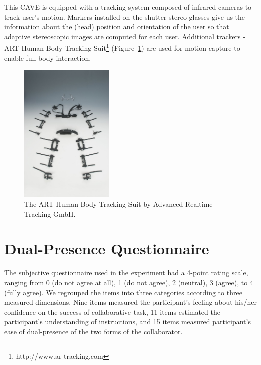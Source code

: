 \begin{appendices}
This CAVE is equipped with a tracking system composed of infrared cameras to track user's motion. Markers installed on the shutter stereo glasses give us the information about the (head) position and orientation of the user so that adaptive stereoscopic images are computed for each user. Additional trackers - ART-Human Body Tracking Suit\footnote{http://www.ar-tracking.com} (Figure~\ref{fig:mocap}) are used for motion capture to enable full body interaction.

\begin{figure}[tb]
  \centering
  \includegraphics[width=0.4\textwidth]{figures/app/Mocap}
  \caption{\label{fig:mocap}The ART-Human Body Tracking Suit by Advanced Realtime Tracking GmbH.}
\end{figure}

\chapter{Dual-Presence Questionnaire}
\label{appendix:dual_pres_q}
The subjective questionnaire used in the experiment had a 4-point rating scale, ranging from 0 (do not agree at all), 1 (do not agree), 2 (neutral), 3 (agree), to 4 (fully agree). We regrouped the items into three categories according to three measured dimensions. Nine items measured the participant's feeling about his/her confidence on the success of collaborative task, 11 items estimated the participant's understanding of instructions, and 15 items measured participant's ease of dual-presence of the two forms of the collaborator.


\end{appendices}
